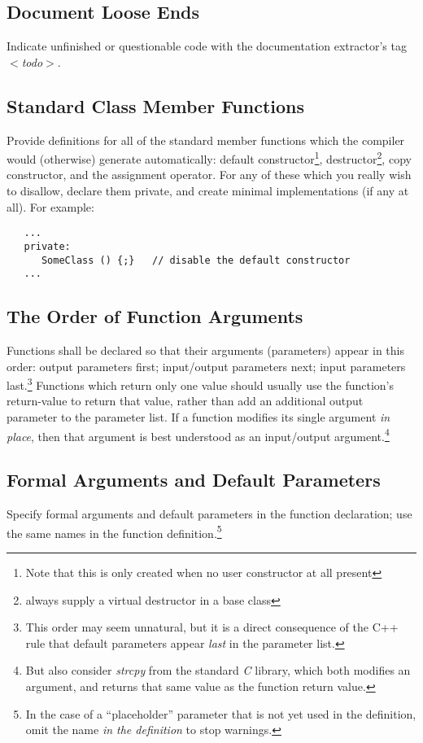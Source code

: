 \subsection {Document Loose Ends}
Indicate unfinished or questionable code with the documentation extractor's
tag {\em $<$todo$>$}.
\subsection {Standard Class Member Functions}
Provide definitions for all of the standard member functions which the
compiler would (otherwise) generate automatically:  default
constructor\footnote {Note that this is only created when
no user constructor at all present},
destructor\footnote {always supply a virtual destructor in a base class},
 copy constructor, and the assignment operator.  For any of 
these which you really wish to disallow, declare them private, and create
minimal implementations (if any at all).  For example:
\begin{verbatim}
   ...
   private:
      SomeClass () {;}   // disable the default constructor
   ...
\end{verbatim}
\subsection {The Order of Function Arguments }
Functions shall be declared so that their arguments (parameters) appear in 
this order: output parameters first; input/output parameters next; 
input parameters last.\footnote {This order may seem unnatural, but it is a 
direct consequence of the C++ rule that default parameters appear
{\em last} in the parameter list.}  Functions which return only one value 
should usually use the function's return-value to return that value, rather
than add an additional output parameter to the parameter list.  If
a function modifies its single argument {\em in place}, then that
argument is best understood as an input/output argument.\footnote
{But also consider {\em strcpy} from the 
standard {\em C} library, which both modifies an argument, and returns 
that same value as the function return value.}
\subsection {Formal Arguments and Default Parameters}
Specify formal arguments and default parameters in the function declaration;
use the same names in the function \bmar
definition.\footnote {In the case of a
``placeholder'' parameter that is not yet used in the definition, omit the
name {\em in the definition} to stop warnings.}
